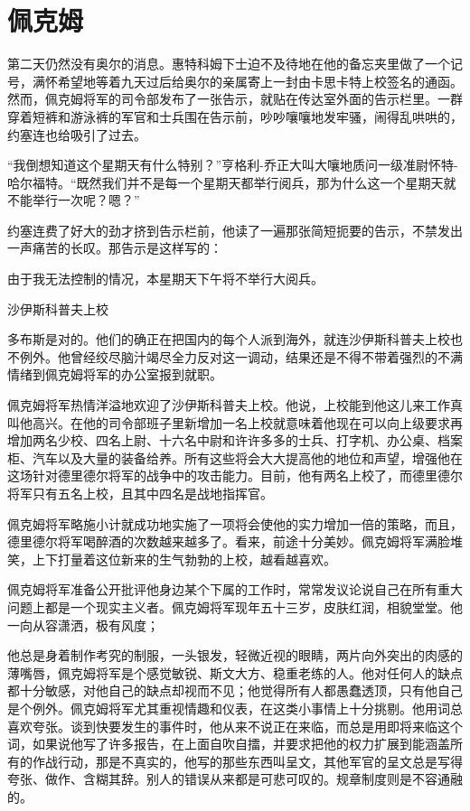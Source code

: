 \chapter{佩克姆}
 
    第二天仍然没有奥尔的消息。惠特科姆下士迫不及待地在他的备忘夹里做了一个记号，满怀希望地等着九天过后给奥尔的亲属寄上一封由卡思卡特上校签名的通函。然而，佩克姆将军的司令部发布了一张告示，就贴在传达室外面的告示栏里。一群穿着短裤和游泳裤的军官和士兵围在告示前，吵吵嚷嚷地发牢骚，闹得乱哄哄的，约塞连也给吸引了过去。

    “我倒想知道这个星期天有什么特别？”亨格利-乔正大叫大嚷地质问一级准尉怀特-哈尔福特。“既然我们并不是每一个星期天都举行阅兵，那为什么这一个星期天就不能举行一次呢？嗯？”

    约塞连费了好大的劲才挤到告示栏前，他读了一遍那张简短扼要的告示，不禁发出一声痛苦的长叹。那告示是这样写的：

    由于我无法控制的情况，本星期天下午将不举行大阅兵。

    沙伊斯科普夫上校

    多布斯是对的。他们的确正在把国内的每个人派到海外，就连沙伊斯科普夫上校也不例外。他曾经绞尽脑汁竭尽全力反对这一调动，结果还是不得不带着强烈的不满情绪到佩克姆将军的办公室报到就职。

    佩克姆将军热情洋溢地欢迎了沙伊斯科普夫上校。他说，上校能到他这儿来工作真叫他高兴。在他的司令部班子里新增加一名上校就意味着他现在可以向上级要求再增加两名少校、四名上尉、十六名中尉和许许多多的士兵、打字机、办公桌、档案柜、汽车以及大量的装备给养。所有这些将会大大提高他的地位和声望，增强他在这场针对德里德尔将军的战争中的攻击能力。目前，他有两名上校了，而德里德尔将军只有五名上校，且其中四名是战地指挥官。

    佩克姆将军略施小计就成功地实施了一项将会使他的实力增加一倍的策略，而且，德里德尔将军喝醉酒的次数越来越多了。看来，前途十分美妙。佩克姆将军满脸堆笑，上下打量着这位新来的生气勃勃的上校，越看越喜欢。

 


    佩克姆将军准备公开批评他身边某个下属的工作时，常常发议论说自己在所有重大问题上都是一个现实主义者。佩克姆将军现年五十三岁，皮肤红润，相貌堂堂。他一向从容潇洒，极有风度；

    他总是身着制作考究的制服，一头银发，轻微近视的眼睛，两片向外突出的肉感的薄嘴唇，佩克姆将军是个感觉敏锐、斯文大方、稳重老练的人。他对任何人的缺点都十分敏感，对他自己的缺点却视而不见；他觉得所有人都愚蠢透顶，只有他自己是个例外。佩克姆将军尤其重视情趣和仪表，在这类小事情上十分挑剔。他用词总喜欢夸张。谈到快要发生的事件时，他从来不说正在来临，而总是用即将来临这个词，如果说他写了许多报告，在上面自吹自擂，并要求把他的权力扩展到能涵盖所有的作战行动，那是不真实的，他写的那些东西叫呈文，其他军官的呈文总是写得夸张、做作、含糊其辞。别人的错误从来都是可悲可叹的。规章制度则是不容通融的。

